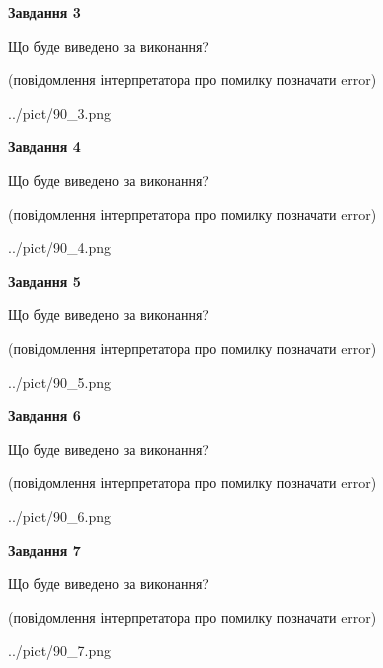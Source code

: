 \documentclass[12pt, ukrainian]{article}
\begin{document}
{\begin {large}
{\begin {center}\textbf{Завдання 3}\end {center}}\par
Що буде виведено за виконання?\par
 (повідомлення інтерпретатора про помилку позначати error)\par
\begin{center}
	{../pict/90_3.png}
\end{center}
\newpage

{\begin {center}\textbf{Завдання 4}\end {center}}\par
Що буде виведено за виконання?\par
 (повідомлення інтерпретатора про помилку позначати error)\par
\begin{center}
	{../pict/90_4.png}
\end{center}
\newpage

{\begin {center}\textbf{Завдання 5}\end {center}}\par
Що буде виведено за виконання?\par
 (повідомлення інтерпретатора про помилку позначати error)\par
\begin{center}
	{../pict/90_5.png}
\end{center}
\newpage

{\begin {center}\textbf{Завдання 6}\end {center}}\par
Що буде виведено за виконання?\par
 (повідомлення інтерпретатора про помилку позначати error)\par
\begin{center}
	{../pict/90_6.png}
\end{center}
\newpage

{\begin {center}\textbf{Завдання 7}\end {center}}\par
Що буде виведено за виконання?\par
 (повідомлення інтерпретатора про помилку позначати error)\par
\begin{center}
	{../pict/90_7.png}
\end{center}
\newpage


\end{large}}
\end{document}
